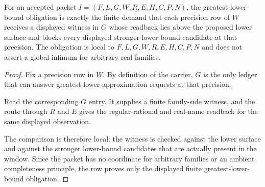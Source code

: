 \begin{theorem}
\label{thm:located-infimum-greatest-lower-bound-obligation}
For an accepted packet $I=(F,L,G,W,R,E,H,C,P,N)$, the greatest-lower-bound obligation is exactly the finite demand that each precision row of $W$ receives a displayed witness in $G$ whose readback lies above the proposed lower surface and blocks every displayed stronger lower-bound candidate at that precision. The obligation is local to $F,L,G,W,R,E,H,C,P,N$ and does not assert a global infimum for arbitrary real families.
\end{theorem}
\begin{proof}
Fix a precision row in $W$. By definition of the carrier, $G$ is the only ledger that can answer greatest-lower-approximation requests at that precision.

Read the corresponding $G$ entry. It supplies a finite family-side witness, and the route through $R$ and $E$ gives the regular-rational and real-name readback for the same displayed observation.

The comparison is therefore local: the witness is checked against the lower surface and against the stronger lower-bound candidates that are actually present in the window. Since the packet has no coordinate for arbitrary families or an ambient completeness principle, the row proves only the displayed finite greatest-lower-bound obligation.
\end{proof}

